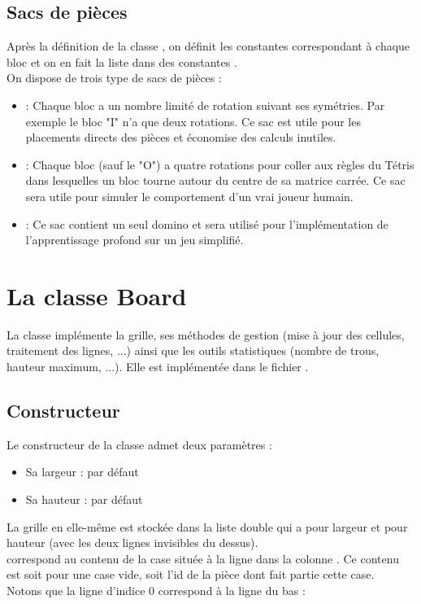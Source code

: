 \subsection{Sacs de pièces}
Après la définition de la classe , on définit les constantes correspondant à chaque bloc et on en fait la liste dans des constantes .\\
On dispose de trois type de sacs de pièces :
\begin{itemize}
	\item {} : Chaque bloc a un nombre limité de rotation suivant ses symétries. Par exemple le bloc "I" n'a que deux rotations. Ce sac est utile pour les placements directs des pièces et économise des calculs inutiles.
	\item {} : Chaque bloc (sauf le "O") a quatre rotations pour coller aux règles du Tétris dans lesquelles un bloc tourne autour du centre de sa matrice carrée. Ce sac sera utile pour simuler le comportement d'un vrai joueur humain.	
	\item {} : Ce sac contient un seul domino et sera utilisé pour l'implémentation de l'apprentissage profond sur un jeu simplifié.
\end{itemize}

\section{La classe Board}
La classe  implémente la grille, ses méthodes de gestion (mise à jour des cellules, traitement des lignes, ...) ainsi que les outils statistiques (nombre de trous, hauteur maximum, ...). Elle est implémentée dans le fichier .

\subsection{Constructeur}
Le constructeur de la classe  admet deux paramètres :
\begin{itemize}
	\item Sa largeur :  par défaut
	\item Sa hauteur :  par défaut
\end{itemize}

La grille en elle-même est stockée dans la liste double  qui a pour largeur  et pour hauteur  (avec les deux lignes invisibles du dessus).\\
 correspond au contenu de la case située à la ligne  dans la colonne . Ce contenu est soit  pour une case vide, soit l'id de la pièce dont fait partie cette case.\\
Notons que la ligne d'indice 0 correspond à la ligne du bas :

